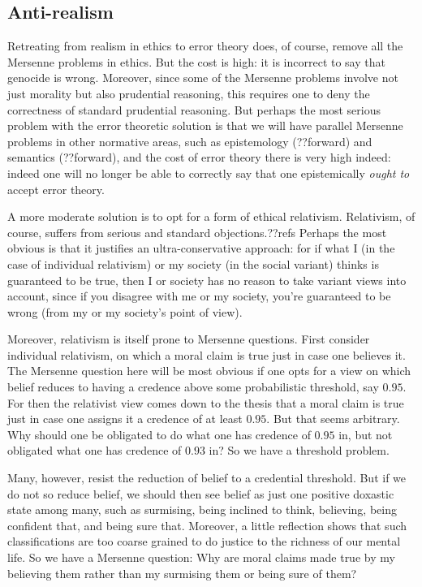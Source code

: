 \subsection{Anti-realism}
Retreating from realism in ethics to error theory does, of course, remove all the Mersenne problems in ethics. But the
cost is high: it is incorrect to say that genocide is wrong. Moreover, since some of the Mersenne problems involve not
just morality but also prudential reasoning, this requires one to deny the correctness of standard prudential reasoning.
But perhaps the most serious problem with the error theoretic solution is that we will have parallel Mersenne problems
in other normative areas, such as epistemology (??forward) and semantics (??forward), and the cost of error theory 
there is very high indeed: indeed one will no longer  be able to correctly say that one epistemically \textit{ought to} accept error theory.

A more moderate solution is to opt for a form of ethical relativism. Relativism, of course, suffers from serious and
standard objections.??refs Perhaps the most obvious is that it justifies an ultra-conservative approach: for if what
I (in the case of individual relativism) or my society (in the social variant) thinks is guaranteed to be true, then
I or society has no reason to take variant views into account, since if you disagree with me or my society, you're guaranteed to be 
wrong (from my or my society's point of view).

Moreover, relativism is itself prone to
Mersenne questions. First consider individual relativism, on which a moral claim is true just in case one believes
it. The Mersenne question here will be most obvious if one opts for a view on which belief reduces to having a
credence above some probabilistic threshold, say $0.95$. For then the relativist view comes down to the thesis
that a moral claim is true just in case one assigns it a credence of at least $0.95$. But that seems arbitrary.
Why should one be obligated to do what one has credence of $0.95$ in, but not obligated what one has credence of $0.93$ in?
So we have a threshold problem.

Many, however, resist the reduction of belief to a credential threshold. But if we do not so reduce belief, we should
then see belief as just one positive doxastic state among many, such as surmising, being inclined to think, believing,
being confident that, and being sure that. Moreover, a little reflection shows that
such classifications are too coarse grained to do justice to the richness of our mental life. So we have a Mersenne
question: Why are moral claims made true by my believing them rather than my surmising them or being sure of them?


